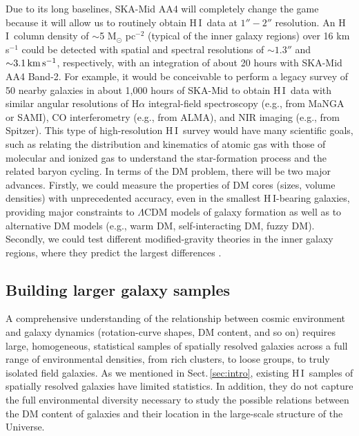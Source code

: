 \documentclass[a4paper,11pt]{article}
\newcommand{\hi } {{\rm H}\,{\small\rm I}}
\begin{document}
Due to its long baselines, SKA-Mid AA4 will completely change the game because it will allow us to routinely obtain \hi\ data at $1''-2''$ resolution. An \hi\ column density of ${\sim}$5 M$_\odot$ pc$^{-2}$ (typical of the inner galaxy regions) over 16 km s$^{-1}$ could be detected with spatial and spectral resolutions of ${\sim}1.3''$ and ${\sim}3.1\rm\,km\,s^{-1}$, respectively, with an integration of about 20 hours with SKA-Mid AA4 Band-2. For example, it would be conceivable to perform a legacy survey of 50 nearby galaxies in about 1,000 hours of SKA-Mid to obtain \hi\ data with similar angular resolutions of H$\alpha$ integral-field spectroscopy (e.g., from MaNGA or SAMI), CO interferometry (e.g., from ALMA), and NIR imaging (e.g., from Spitzer). This type of high-resolution \hi\ survey would have many scientific goals, such as relating the distribution and kinematics of atomic gas with those of molecular and ionized gas to understand the star-formation process and the related baryon cycling. In terms of the DM problem, there will be two major advances. Firstly, we could measure the properties of DM cores (sizes, volume densities) with unprecedented accuracy, even in the smallest \hi-bearing galaxies, providing major constraints to $\Lambda$CDM models of galaxy formation as well as to alternative DM models (e.g., warm DM, self-interacting DM, fuzzy DM). Secondly, we could test different modified-gravity theories in the inner galaxy regions, where they predict the largest differences \citep[e.g.,][]{Brada1995, Lelli2017b, Petersen2020, Chae2022b}.

\subsection{Building larger galaxy samples}\label{sec:largesamples}

A comprehensive understanding of the relationship between cosmic environment and galaxy dynamics (rotation-curve shapes, DM content, and so on) requires large, homogeneous, statistical samples of spatially resolved galaxies across a full range of environmental densities, from rich clusters, to loose groups, to truly isolated field galaxies. As we mentioned in Sect.\,\ref{sec:intro}, existing \hi\ samples of spatially resolved galaxies have limited statistics. In addition, they do not capture the full environmental diversity necessary to study the possible relations between the DM content of galaxies and their location in the large-scale structure of the Universe.
\end{document}
